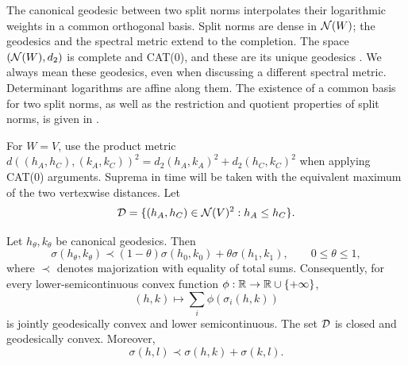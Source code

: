 The canonical geodesic between two split norms interpolates their
logarithmic weights in a common orthogonal basis. Split norms are dense
in $\mathcal N(W)$; the geodesics and the spectral metric extend to the
completion. The space $(\mathcal N(W),d_2)$ is complete and CAT(0), and these
are its unique geodesics \cite[Theorem~1.19 and Corollary~3.3]{BE21}.
We always mean these geodesics, even when discussing a different
spectral metric. Determinant logarithms are affine along them.
The existence of a common basis for two split norms, as well as the
restriction and quotient properties of split norms, is given in
\cite[Lemma~1.13 and Proposition~1.14]{BE21}.

For $W=V$, use the product metric
$d((h_A,h_C),(k_A,k_C))^2=d_2(h_A,k_A)^2+d_2(h_C,k_C)^2$ when applying
CAT(0) arguments. Suprema in time will be taken with the equivalent
maximum of the two vertexwise distances. Let
\[
 \mathcal D=\{(h_A,h_C)\in\mathcal N(V)^2:h_A\le h_C\}.
\]

\begin{lemma}\label{lem:spectralconvexity}
Let $h_\theta,k_\theta$ be canonical geodesics. Then
\begin{equation}\label{eq:jointmajorization}
 \sigma(h_\theta,k_\theta)
 \prec(1-\theta)\sigma(h_0,k_0)+\theta\sigma(h_1,k_1),
 \qquad 0\le\theta\le1,
\end{equation}
where $\prec$ denotes majorization with equality of total sums.
Consequently, for every lower-semicontinuous convex function
$\phi:\mathbb R\to\mathbb R\cup\{+\infty\}$,
\begin{equation}\label{eq:costconvexity}
 (h,k)\longmapsto\sum_i\phi(\sigma_i(h,k))
\end{equation}
is jointly geodesically convex and lower semicontinuous.
The set $\mathcal D$ is closed and geodesically convex. Moreover,
\begin{equation}\label{eq:trianglemajorization}
 \sigma(h,l)\prec\sigma(h,k)+\sigma(k,l).
\end{equation}
\end{lemma}


